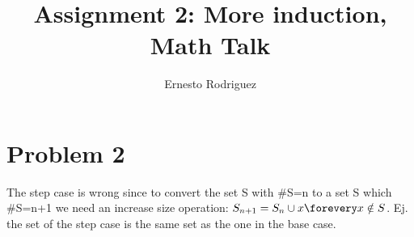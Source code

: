 \documentclass{article}
\title{Assignment 2: More induction, Math Talk}
\author{Ernesto Rodriguez}
\begin{document}
\maketitle

\section{Problem 2}

The step case is wrong since to convert the set S with #S=n to a set S which #S=n+1 we need an increase size operation: $S_{n+1}=S_{n} \cup {x} \forevery x \notin S$. Ej. the set of the step case is the same set as the one in the base case.
\end{document}
